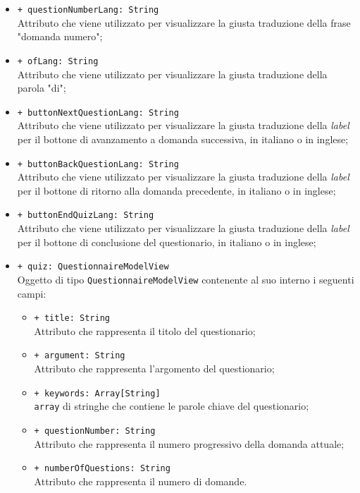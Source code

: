 \begin{itemize}
\begin{itemize}
			\item \texttt{+ questionNumberLang: String} \\ Attributo che viene utilizzato per visualizzare la giusta traduzione della frase "domanda numero";
			\item \texttt{+ ofLang: String} \\ Attributo che viene utilizzato per visualizzare la giusta traduzione della parola "di";
			\item \texttt{+ buttonNextQuestionLang: String} \\ Attributo che viene utilizzato per visualizzare la giusta traduzione della \textit{label} per il bottone di avanzamento a domanda successiva, in italiano o in inglese;
			\item \texttt{+ buttonBackQuestionLang: String} \\ Attributo che viene utilizzato per visualizzare la giusta traduzione della \textit{label} per il bottone di ritorno alla domanda precedente, in italiano o in inglese;
			\item \texttt{+ buttonEndQuizLang: String} \\ Attributo che viene utilizzato per visualizzare la giusta traduzione della \textit{label} per il bottone di conclusione del questionario, in italiano o in inglese;
			\item \texttt{+ quiz: QuestionnaireModelView} \\ Oggetto di tipo \texttt{QuestionnaireModelView} contenente al suo interno i seguenti campi:
			\begin{itemize}
				\item \texttt{+ title: String} \\ Attributo che rappresenta il titolo del questionario;
				\item \texttt{+ argument: String} \\ Attributo che rappresenta l'argomento del questionario;
				\item \texttt{+ keywords: Array[String]} \\ \texttt{array} di stringhe che contiene le parole chiave del questionario;
				\item \texttt{+ questionNumber: String} \\ Attributo che rappresenta il numero progressivo della domanda attuale;
				\item \texttt{+ numberOfQuestions: String} \\ Attributo che rappresenta il numero di domande.
			\end{itemize}
		\end{itemize}
\end{itemize}